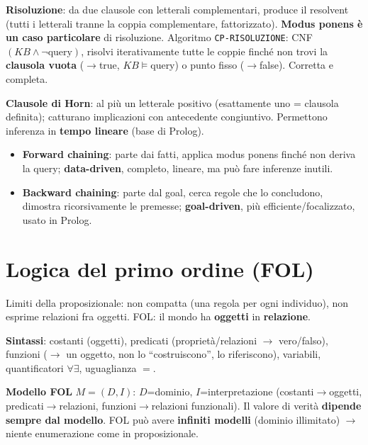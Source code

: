 \documentclass[10pt,a4paper]{article}
\begin{document}
\textbf{Risoluzione}: da due clausole con letterali complementari, produce il resolvent (tutti i letterali tranne la coppia complementare, fattorizzato). \textbf{Modus ponens è un caso particolare} di risoluzione. Algoritmo \texttt{CP-RISOLUZIONE}: CNF$(KB\wedge\neg\text{query})$, risolvi iterativamente tutte le coppie finché non trovi la \textbf{clausola vuota} ($\to$true, $KB\models$query) o punto fisso ($\to$false). Corretta e completa.

\textbf{Clausole di Horn}: al più un letterale positivo (esattamente uno = clausola definita); catturano implicazioni con antecedente congiuntivo. Permettono inferenza in \textbf{tempo lineare} (base di Prolog).
\begin{itemize}
  \item \textbf{Forward chaining}: parte dai fatti, applica modus ponens finché non deriva la query; \textbf{data-driven}, completo, lineare, ma può fare inferenze inutili.
  \item \textbf{Backward chaining}: parte dal goal, cerca regole che lo concludono, dimostra ricorsivamente le premesse; \textbf{goal-driven}, più efficiente/focalizzato, usato in Prolog.
\end{itemize}

\section{Logica del primo ordine (FOL)}

Limiti della proposizionale: non compatta (una regola per ogni individuo), non esprime relazioni fra oggetti. FOL: il mondo ha \textbf{oggetti} in \textbf{relazione}.

\textbf{Sintassi}: costanti (oggetti), predicati (proprietà/relazioni $\to$ vero/falso), funzioni ($\to$ un oggetto, non lo ``costruiscono'', lo riferiscono), variabili, quantificatori $\forall\exists$, uguaglianza $=$.

\textbf{Modello FOL} $M=(D,I)$: $D$=dominio, $I$=interpretazione (costanti$\to$oggetti, predicati$\to$relazioni, funzioni$\to$relazioni funzionali). Il valore di verità \textbf{dipende sempre dal modello}. FOL può avere \textbf{infiniti modelli} (dominio illimitato) $\to$ niente enumerazione come in proposizionale.
\end{document}
